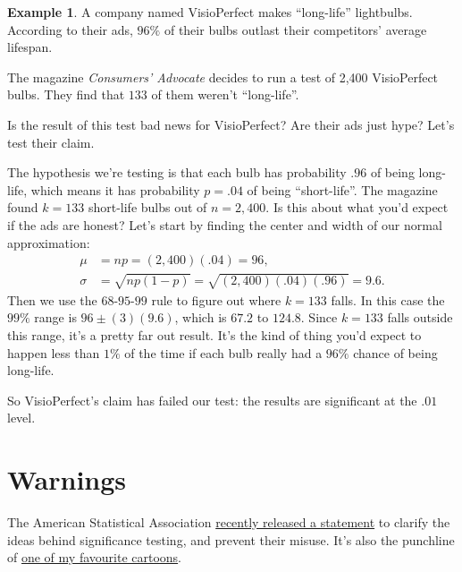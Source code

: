 \documentclass[justified]{tufte-book}
\theoremstyle{definition}
\theoremstyle{definition}
\newtheorem{example}{Example}[chapter]
\theoremstyle{definition}
\theoremstyle{remark}
\begin{document}
\begin{example}
A company named VisioPerfect makes ``long-life'' lightbulbs. According
to their ads, \(96\%\) of their bulbs outlast their competitors' average
lifespan.

The magazine \emph{Consumers' Advocate} decides to run a test of 2,400
VisioPerfect bulbs. They find that \(133\) of them weren't
``long-life''.\\
\end{example}

Is the result of this test bad news for VisioPerfect? Are their ads just
hype? Let's test their claim.

The hypothesis we're testing is that each bulb has probability \(.96\)
of being long-life, which means it has probability \(p = .04\) of being
``short-life''. The magazine found \(k = 133\) short-life bulbs out of
\(n = 2,400\). Is this about what you'd expect if the ads are honest?
Let's start by finding the center and width of our normal approximation:
\[
  \begin{aligned}
    \mu &= np = (2,400)(.04) = 96,\\
    \sigma &= \sqrt{np(1-p)} = \sqrt{(2,400)(.04)(.96)} = 9.6.
  \end{aligned}
\] Then we use the \(68\)-\(95\)-\(99\) rule to figure out where
\(k = 133\) falls. In this case the \(99\%\) range is
\(96 \pm (3)(9.6)\), which is \(67.2\) to \(124.8\). Since \(k = 133\)
falls outside this range, it's a pretty far out result. It's the kind of
thing you'd expect to happen less than \(1\%\) of the time if each bulb
really had a \(96\%\) chance of being long-life.

So VisioPerfect's claim has failed our test: the results are significant
at the \(.01\) level.

\hypertarget{warnings}{%
\section{Warnings}\label{warnings}}

\begin{marginfigure}
The American Statistical Association
\href{https://www.amstat.org/newsroom/pressreleases/P-ValueStatement.pdf}{recently
released a statement} to clarify the ideas behind significance testing,
and prevent their misuse. It's also the punchline of
\href{https://imgs.xkcd.com/comics/significant.png}{one of my favourite
cartoons}.
\end{marginfigure}
\end{document}
